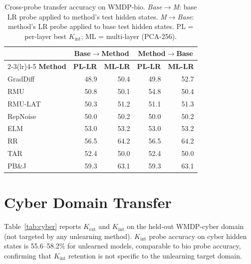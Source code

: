 \documentclass[11pt]{article}
\begin{document}
\begin{table}[h]
\centering
\caption{Cross-probe transfer accuracy on WMDP-bio.
\emph{Base$\to$M}: base LR probe applied to method's test hidden states.
\emph{M$\to$Base}: method's LR probe applied to base test hidden states.
PL = per-layer best $K_\text{int}$; ML = multi-layer (PCA-256).}
\label{tab:cross-probe}
\small
\setlength{\tabcolsep}{4pt}
\begin{tabular}{lrrrr}
\toprule
 & \multicolumn{2}{c}{\textbf{Base$\to$Method}} & \multicolumn{2}{c}{\textbf{Method$\to$Base}} \\
\cmidrule(lr){2-3}\cmidrule(lr){4-5}
\textbf{Method} & \textbf{PL-LR} & \textbf{ML-LR} & \textbf{PL-LR} & \textbf{ML-LR} \\
\midrule
GradDiff  & 48.9 & 50.4 & 49.8 & 52.7 \\
RMU       & 50.8 & 50.1 & 54.8 & 50.4 \\
RMU-LAT   & 50.3 & 51.2 & 51.1 & 51.3 \\
RepNoise  & 50.0 & 50.2 & 50.0 & 50.2 \\
ELM       & 53.0 & 53.2 & 53.0 & 53.2 \\
RR        & 56.5 & 64.2 & 56.5 & 64.2 \\
TAR       & 52.4 & 50.0 & 52.4 & 50.0 \\
PB\&J     & 59.3 & 63.1 & 59.3 & 63.1 \\
\bottomrule
\end{tabular}
\end{table}

\section{Cyber Domain Transfer}
\label{app:cyber}

Table~\ref{tab:cyber} reports $K_\text{ext}$ and $K_\text{int}$ on the
held-out WMDP-cyber domain (not targeted by any unlearning method).
$K_\text{int}$ probe accuracy on cyber hidden states is 55.6--58.2\% for
unlearned models, comparable to bio probe accuracy, confirming that
$K_\text{int}$ retention is not specific to the unlearning target domain.
\end{document}
